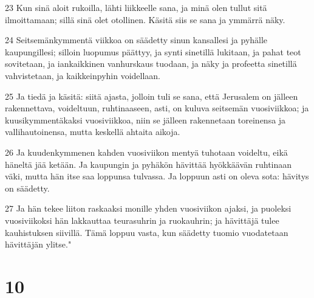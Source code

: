 \par 23 Kun sinä aloit rukoilla, lähti liikkeelle sana, ja minä olen tullut sitä ilmoittamaan; sillä sinä olet otollinen. Käsitä siis se sana ja ymmärrä näky.
\par 24 Seitsemänkymmentä viikkoa on säädetty sinun kansallesi ja pyhälle kaupungillesi; silloin luopumus päättyy, ja synti sinetillä lukitaan, ja pahat teot sovitetaan, ja iankaikkinen vanhurskaus tuodaan, ja näky ja profeetta sinetillä vahvistetaan, ja kaikkeinpyhin voidellaan.
\par 25 Ja tiedä ja käsitä: siitä ajasta, jolloin tuli se sana, että Jerusalem on jälleen rakennettava, voideltuun, ruhtinaaseen, asti, on kuluva seitsemän vuosiviikkoa; ja kuusikymmentäkaksi vuosiviikkoa, niin se jälleen rakennetaan toreinensa ja vallihautoinensa, mutta keskellä ahtaita aikoja.
\par 26 Ja kuudenkymmenen kahden vuosiviikon mentyä tuhotaan voideltu, eikä häneltä jää ketään. Ja kaupungin ja pyhäkön hävittää hyökkäävän ruhtinaan väki, mutta hän itse saa loppunsa tulvassa. Ja loppuun asti on oleva sota: hävitys on säädetty.
\par 27 Ja hän tekee liiton raskaaksi monille yhden vuosiviikon ajaksi, ja puoleksi vuosiviikoksi hän lakkauttaa teurasuhrin ja ruokauhrin; ja hävittäjä tulee kauhistuksen siivillä. Tämä loppuu vasta, kun säädetty tuomio vuodatetaan hävittäjän ylitse."

\chapter{10}

